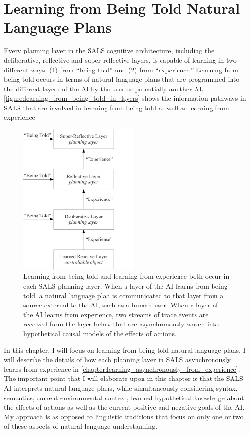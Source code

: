 \chapter{Learning from Being Told Natural Language Plans}
\label{chapter:learning_from_being_told}

Every planning layer in the SALS cognitive architecture, including the
deliberative, reflective and super-reflective layers, is capable of
learning in two different ways: (1) from ``being told'' and (2) from
``experience.''  Learning from being told occurs in terms of natural
language plans that are programmed into the different layers of the AI
by the user or potentially another AI.
{\mbox{\autoref{figure:learning_from_being_told_in_layers}}} shows the
information pathways in SALS that are involved in learning from being
told as well as learning from experience.
\begin{figure}
\centering
\includegraphics[width=6cm]{gfx/learning_from_being_told_in_layers}
\caption[Learning from being told and learning from experience both
  occur in each SALS planning layer.]{Learning from being told and
  learning from experience both occur in each SALS planning layer.
  When a layer of the AI learns from being told, a natural language
  plan is communicated to that layer from a source external to the AI,
  such as a human user.  When a layer of the AI learns from
  experience, two streams of trace events are received from the layer
  below that are asynchronously woven into hypothetical causal models
  of the effects of actions.}
\label{figure:learning_from_being_told_in_layers}
\end{figure}
In this chapter, I will focus on learning from being told natural
language plans.  I will describe the details of how each planning
layer in SALS asynchronously learns from experience in
{\mbox{\autoref{chapter:learning_asynchronously_from_experience}}}.
The important point that I will elaborate upon in this chapter is that
the SALS AI interprets natural language plans, while simultaneously
considering syntax, semantics, current environmental context, learned
hypothetical knowledge about the effects of actions as well as the
current positive and negative goals of the AI.  My approach is as
opposed to linguistic traditions that focus on only one or two of
these aspects of natural language understanding.

